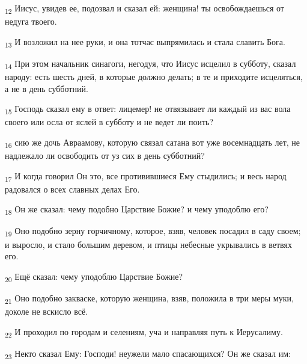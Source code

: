 \begin{tcolorbox}
\textsubscript{12} Иисус, увидев ее, подозвал и сказал ей: женщина! ты освобождаешься от недуга твоего.
\end{tcolorbox}
\begin{tcolorbox}
\textsubscript{13} И возложил на нее руки, и она тотчас выпрямилась и стала славить Бога.
\end{tcolorbox}
\begin{tcolorbox}
\textsubscript{14} При этом начальник синагоги, негодуя, что Иисус исцелил в субботу, сказал народу: есть шесть дней, в которые должно делать; в те и приходите исцеляться, а не в день субботний.
\end{tcolorbox}
\begin{tcolorbox}
\textsubscript{15} Господь сказал ему в ответ: лицемер! не отвязывает ли каждый из вас вола своего или осла от яслей в субботу и не ведет ли поить?
\end{tcolorbox}
\begin{tcolorbox}
\textsubscript{16} сию же дочь Авраамову, которую связал сатана вот уже восемнадцать лет, не надлежало ли освободить от уз сих в день субботний?
\end{tcolorbox}
\begin{tcolorbox}
\textsubscript{17} И когда говорил Он это, все противившиеся Ему стыдились; и весь народ радовался о всех славных делах Его.
\end{tcolorbox}
\begin{tcolorbox}
\textsubscript{18} Он же сказал: чему подобно Царствие Божие? и чему уподоблю его?
\end{tcolorbox}
\begin{tcolorbox}
\textsubscript{19} Оно подобно зерну горчичному, которое, взяв, человек посадил в саду своем; и выросло, и стало большим деревом, и птицы небесные укрывались в ветвях его.
\end{tcolorbox}
\begin{tcolorbox}
\textsubscript{20} Ещё сказал: чему уподоблю Царствие Божие?
\end{tcolorbox}
\begin{tcolorbox}
\textsubscript{21} Оно подобно закваске, которую женщина, взяв, положила в три меры муки, доколе не вскисло всё.
\end{tcolorbox}
\begin{tcolorbox}
\textsubscript{22} И проходил по городам и селениям, уча и направляя путь к Иерусалиму.
\end{tcolorbox}
\begin{tcolorbox}
\textsubscript{23} Некто сказал Ему: Господи! неужели мало спасающихся? Он же сказал им:
\end{tcolorbox}
